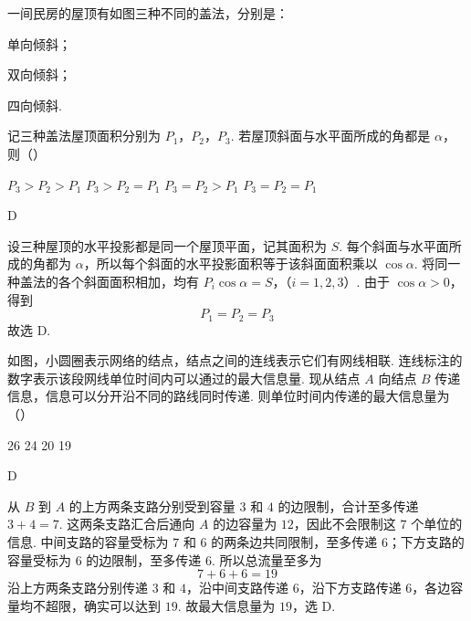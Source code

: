 \begin{problem}
一间民房的屋顶有如图三种不同的盖法，分别是：

\begin{circlelist}
\item 单向倾斜；
\item 双向倾斜；
\item 四向倾斜.
\end{circlelist}

记三种盖法屋顶面积分别为 \(P_{1}\)，\(P_{2}\)，\(P_{3}\). 若屋顶斜面与水平面所成的角都是 \(\alpha\)，则（\quad）

\begin{center}
\end{center}

\choices
    {\(P_{3} > P_{2} > P_{1}\)}
    {\(P_{3} > P_{2} = P_{1}\)}
    {\(P_{3} = P_{2} > P_{1}\)}
    {\(P_{3} = P_{2} = P_{1}\)}
\end{problem}

\begin{answer}
D
\end{answer}

\begin{solution}
设三种屋顶的水平投影都是同一个屋顶平面，记其面积为 \(S\). 每个斜面与水平面所成的角都为 \(\alpha\)，所以每个斜面的水平投影面积等于该斜面面积乘以 \(\cos\alpha\). 将同一种盖法的各个斜面面积相加，均有
\(P_i\cos\alpha=S\)，（\(i=1,2,3\)）.
由于 \(\cos\alpha>0\)，得到
\[
P_1=P_2=P_3
\]
故选 D.
\end{solution}

\begin{problem}
如图，小圆圈表示网络的结点，结点之间的连线表示它们有网线相联. 连线标注的数字表示该段网线单位时间内可以通过的最大信息量. 现从结点 \(A\) 向结点 \(B\) 传递信息，信息可以分开沿不同的路线同时传递. 则单位时间内传递的最大信息量为（\quad）


\choices
    {26}
    {24}
    {20}
    {19}
\end{problem}

\begin{answer}
D
\end{answer}

\begin{solution}
从 \(B\) 到 \(A\) 的上方两条支路分别受到容量 \(3\) 和 \(4\) 的边限制，合计至多传递 \(3+4=7\). 这两条支路汇合后通向 \(A\) 的边容量为 \(12\)，因此不会限制这 \(7\) 个单位的信息. 中间支路的容量受标为 \(7\) 和 \(6\) 的两条边共同限制，至多传递 \(6\)；下方支路的容量受标为 \(6\) 的边限制，至多传递 \(6\). 所以总流量至多为
\[
7+6+6=19
\]
沿上方两条支路分别传递 \(3\) 和 \(4\)，沿中间支路传递 \(6\)，沿下方支路传递 \(6\)，各边容量均不超限，确实可以达到 \(19\). 故最大信息量为 \(19\)，选 D.
\end{solution}

